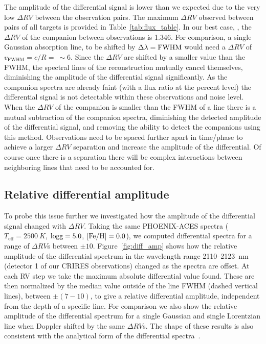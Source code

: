 The amplitude of the differential signal is lower than we expected due to the very low \(\Delta RV\) between the observation pairs. The maximum \(\Delta RV\) observed between pairs of all targets is provided in Table~\ref{tab:flux_table}.
In our best case, ,  the \(\Delta RV\) of the companion between observations is 1.346\kmps{}. For comparison, a single Gaussian absorption line, to be shifted by \(\Delta\lambda = \rm FWHM\) would need a \(\Delta RV\) of \(v_{\textrm{FWHM}} = c/R =~\sim6\)\kmps{}. Since the \(\Delta RV\) are shifted by a smaller value than the FWHM, the spectral lines of the reconstruction mutually cancel themselves, diminishing the amplitude of the differential signal significantly. As the companion spectra are already faint (with a flux ratio at the percent level) the differential signal is not detectable within these observations and noise level.
When the \(\Delta RV \) of the companion is smaller than the FWHM of a line there is a mutual subtraction of the companion spectra, diminishing the detected amplitude of the differential signal, and removing the ability to detect the companions using this method. Observations need to be spaced further apart in time/phase to achieve a larger \(\Delta RV\) separation and increase the amplitude of the differential. Of course once there is a separation there will be complex interactions between neighboring lines that need to be accounted for.

\subsection{Relative differential amplitude}
To probe this issue further we investigated how the amplitude of the differential signal changed with \(\Delta RV\). Taking the same PHOENIX-ACES spectra (\(T_{\textrm{eff}} = 2500~K \), \(\rm logg=5.0 \), \(\rm [Fe/H]=0.0 \)), we computed differential spectra for a range of \(\Delta RV\)s between \(\pm10\)\kmps{}. Figure~\ref{fig:diff_amp} shows how the relative amplitude of the differential spectrum in the wavelength range 2110--2123~nm (detector 1 of our CRIRES observations) changed as the spectra are offset. At each RV step we take the maximum absolute differential value found. These are then normalized by the median value outside of the line FWHM (dashed vertical lines), between \(\pm(7-10)\)\kmps{}, to give a relative differential amplitude, independent from the depth of a specific line. For comparison we also show the relative amplitude of the differential spectrum for a single Gaussian and single Lorentzian line when Doppler shifted by the same \(\Delta RV \)s. The shape of these results is also consistent with the analytical form of the differential spectra~\citet[][eqn.~A.1]{ferluga_separating_1997}.

